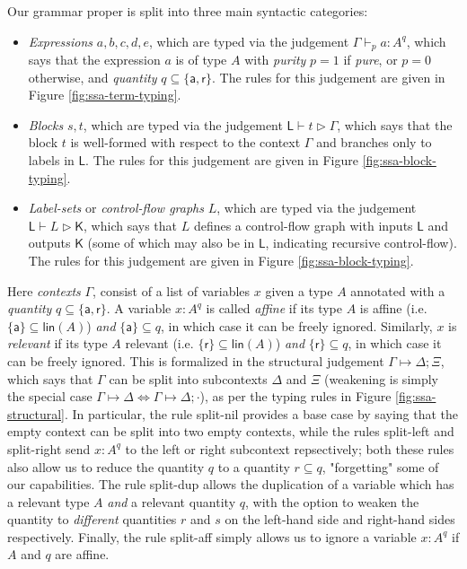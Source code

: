 \documentclass[acmsmall,screen,review]{acmart}
\newcommand{\ms}[1]{\ensuremath{\mathsf{#1}}}
\newcommand{\csplits}[3]{#1 \mapsto #2;#3}
\newcommand{\cwk}[2]{#1 \mapsto #2}
\newcommand{\tlin}[2]{#2 \subseteq \ms{lin}(#1)}
\newcommand{\rle}[1]{{\scriptsize\textsf{#1}}}
\newcommand{\taff}{{\{\ms{a}\}}}
\newcommand{\trel}{{\{\ms{r}\}}}
\newcommand{\tint}{{\{\ms{a}, \ms{r}\}}}
\newcommand{\hasty}[5]{#1 \vdash_{#2} #3: {#4}^{#5}}
\newcommand{\haslb}[3]{#1 \vdash #2 \rhd #3}
\newcommand{\lhaslb}[3]{#1 \vdash #2 \rhd #3}
\begin{document}
Our grammar proper is split into three main syntactic categories:
\begin{itemize}
  \item \textit{Expressions} \(a, b, c, d, e\), which are typed via the
  judgement \(\hasty{\Gamma}{p}{a}{A}{q}\), which says that the expression \(a\)
  is of type \(A\) with \textit{purity} \(p = 1\) if \textit{pure}, or \(p = 0\)
  otherwise, and \textit{quantity} \(q \subseteq \{\ms{a}, \ms{r}\}\). The rules
  for this judgement are given in Figure \ref{fig:ssa-term-typing}.
  \item \textit{Blocks} \(s, t\), which are typed via the judgement
  \(\haslb{\ms{L}}{t}{\Gamma}\), which says that the block \(t\) is well-formed
  with respect to the context \(\Gamma\) and branches only to labels in
  \(\ms{L}\). The rules for this judgement are given in Figure
  \ref{fig:ssa-block-typing}.
  \item \textit{Label-sets} or \textit{control-flow graphs} \(L\), which are
  typed via the judgement \(\lhaslb{\ms{L}}{L}{\ms{K}}\), which says that \(L\)
  defines a control-flow graph with inputs \(\ms{L}\) and outputs \(\ms{K}\)
  (some of which may also be in \(\ms{L}\), indicating recursive control-flow).
  The rules for this judgement are given in Figure \ref{fig:ssa-block-typing}.
\end{itemize}
Here \textit{contexts} \(\Gamma\), consist of a list of variables \(x\) given a
type \(A\) annotated with a \textit{quantity} \(q \subseteq \tint\). A variable
\(x: A^q\) is called \textit{affine} if its type \(A\) is affine (i.e.
\(\tlin{A}{\taff}\)) \textit{and} \(\taff \subseteq q\), in which case it can be
freely ignored. Similarly, \(x\) is \textit{relevant} if its type \(A\) relevant
(i.e. \(\tlin{A}{\trel}\)) \textit{and} \(\trel \subseteq q\), in which case it
can be freely ignored. This is formalized in the structural judgement
\(\csplits{\Gamma}{\Delta}{\Xi}\), which says that \(\Gamma\) can be split into
subcontexts \(\Delta\) and \(\Xi\) (weakening is simply the special case
\(\cwk{\Gamma}{\Delta} \iff \csplits{\Gamma}{\Delta}{\cdot}\)), as per the
typing rules in Figure \ref{fig:ssa-structural}. In particular, the rule
\rle{split-nil} provides a base case by saying that the empty context can be
split into two empty contexts, while the rules \rle{split-left} and
\rle{split-right} send \(x: A^q\) to the left or right subcontext repsectively;
both these rules also allow us to reduce the quantity \(q\) to a quantity \(r
\subseteq q\), "forgetting" some of our capabilities. The rule \rle{split-dup}
allows the duplication of a variable which has a relevant type \(A\)
\textit{and} a relevant quantity \(q\), with the option to weaken the quantity
to \textit{different} quantities \(r\) and \(s\) on the left-hand side and
right-hand sides respectively. Finally, the rule \rle{split-aff} simply allows
us to ignore a variable \(x: A^q\) if \(A\) and \(q\) are affine.
\end{document}
